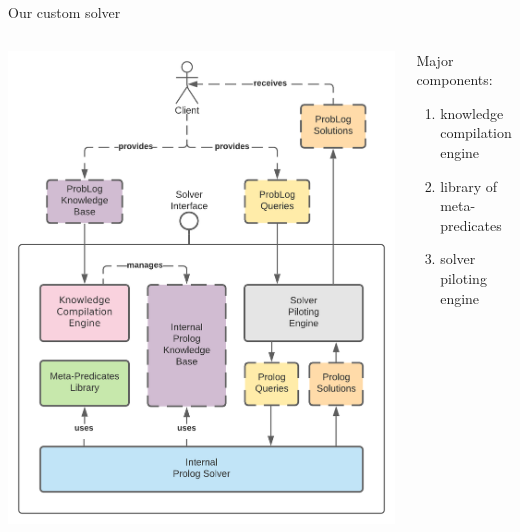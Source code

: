 \documentclass[presentation]{beamer}\mode<presentation>{\usetheme{AMSBolognaFC}}
\begin{document}
\begin{frame}[c]{Our custom \problog{} solver}

    \begin{columns}
        \begin{column}{.5\linewidth}
            \includegraphics[width=\linewidth]{img/design-problog-architecture.pdf}
        \end{column}
        \hfill
        \begin{column}{.5\linewidth}
            Major components:
            \medskip
            \begin{enumerate}
                \item knowledge compilation engine
                \medskip
                \item library of meta-predicates
                \medskip
                \item solver piloting engine
            \end{enumerate}
        \end{column}
    \end{columns}

\end{frame}
\end{document}
